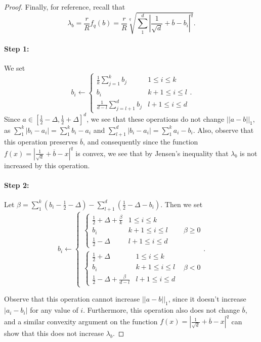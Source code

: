 \begin{proof}
Finally, for reference, recall that $$\lambda_b = \frac{r}{R}f_q(b) = \frac{r}{R}\sqrt[q]{\sum_1^d |\frac{1}{\sqrt{d}} + \overline{b} - b_i|^q}.$$

\paragraph{Step 1:} We set $$b_i \leftarrow  \begin{cases} \frac{1}{k}\sum_{j=1}^k b_j & 1 \leq i \leq k \\b_i & k+1 \leq i \leq l \\  \frac{1}{d-l}\sum_{j=l+1}^d b_j& l+1 \leq i \leq d \end{cases}.$$ Since $a \in [\frac{1}{2} - \Delta, \frac{1}{2} + \Delta]^d$, we see that these operations do not change $||a - b||_1$, as $\sum_1^k |b_i - a_i| = \sum_1^k b_i - a_i$ and $\sum_{l+1}^d |b_i - a_i| = \sum_1^k a_i - b_i$. Also, observe that this operation preserves $\overline{b}$, and consequently since the function $f(x) = |\frac{1}{\sqrt{d}} + \overline{b} - x|^q$ is convex, we see that by Jensen's inequality that $\lambda_b$ is not increased by this operation.

\paragraph{Step 2:} Let $\beta = \sum_1^k(b_i - \frac{1}{2} - \Delta) - \sum_{l+1}^d (\frac{1}{2} - \Delta - b_i)$. Then we set $$b_i \leftarrow  \begin{cases} \begin{cases} \frac{1}{2} + \Delta + \frac{\beta}{k} & 1 \leq i \leq k \\ b_i & k+1 \leq i \leq l \\ \frac{1}{2} - \Delta & l+1 \leq i \leq d \end{cases} & \beta \geq 0 \\\begin{cases} \frac{1}{2} + \Delta & 1 \leq i \leq k \\ b_i & k+1 \leq i \leq l \\ \frac{1}{2} - \Delta + \frac{\beta}{d - l} & l+1 \leq i \leq d \end{cases} & \beta < 0\end{cases}.$$

Observe that this operation cannot increase $||a - b||_1$, since it doesn't increase $|a_i - b_i|$ for any value of $i$. Furthermore, this operation also does not change $\overline{b}$, and a similar convexity argument on the function $f(x) = |\frac{1}{\sqrt{d}} + \overline{b} - x|^q$ can show that this does not increase $\lambda_b$. 


\end{proof}
